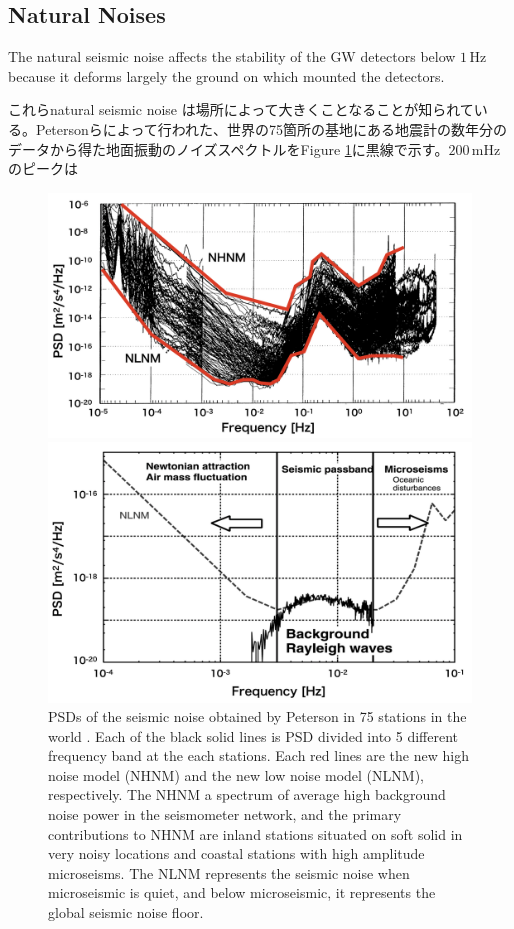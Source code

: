 \subsection{Natural Noises} \label{sec:322}
The natural seismic noise affects the stability of the GW detectors below $1\,\mathrm{Hz}$ because it deforms largely the ground on which mounted the detectors.

これらnatural seismic noise は場所によって大きくことなることが知られている。Petersonらによって行われた、世界の75箇所の基地にある地震計の数年分のデータから得た地面振動のノイズスペクトルをFigure \ref{img:img324}に黒線で示す。$200\,\mathrm{mHz}$のピークは

\begin{figure}[p]
  \begin{center}   
    \includegraphics[width=12.5cm]{./img_chap3/img324.png}
    \caption{PSDs of the seismic noise obtained by Peterson in 75 stations in the world \cite{peterson1993observations}. Each of the black solid lines is PSD divided into 5 different frequency band at the each stations. Each red lines are the new high noise model (NHNM) and the new low noise model (NLNM), respectively. The NHNM a spectrum of average high background noise power in the seismometer network, and the primary contributions to NHNM are inland stations situated on soft solid in very noisy locations and coastal stations with high amplitude microseisms. The NLNM represents the seismic noise when microseismic is quiet, and below microseismic, it represents the global seismic noise floor\cite{nishida2002origin}.}\label{img:img324}
  \end{center}
  \begin{center}   
    \includegraphics[width=12.5cm]{./img_chap3/img325.png}

\end{center}
\end{figure}
